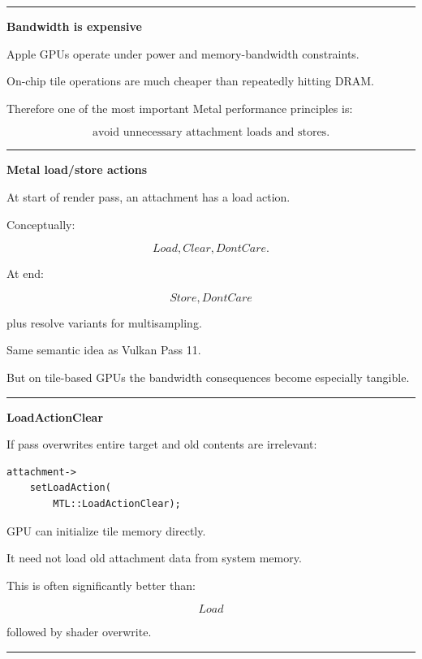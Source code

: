 \begin{center}\rule{0.5\linewidth}{0.5pt}\end{center}

\textbf{Bandwidth is expensive}

Apple GPUs operate under power and memory-bandwidth constraints.

On-chip tile operations are much cheaper than repeatedly hitting DRAM.

Therefore one of the most important Metal performance principles is:

\[
\boxed{
\text{avoid unnecessary attachment loads and stores}.
}
\]

\begin{center}\rule{0.5\linewidth}{0.5pt}\end{center}

\textbf{Metal load/store actions}

At start of render pass, an attachment has a load action.

Conceptually:

\[
Load,
Clear,
DontCare.
\]

At end:

\[
Store,
DontCare
\]

plus resolve variants for multisampling.

Same semantic idea as Vulkan Pass 11.

But on tile-based GPUs the bandwidth consequences become especially tangible.

\begin{center}\rule{0.5\linewidth}{0.5pt}\end{center}

\textbf{LoadActionClear}

If pass overwrites entire target and old contents are irrelevant:

\begin{verbatim}
attachment->
    setLoadAction(
        MTL::LoadActionClear);
\end{verbatim}

GPU can initialize tile memory directly.

It need not load old attachment data from system memory.

This is often significantly better than:

\[
Load
\]

followed by shader overwrite.

\begin{center}\rule{0.5\linewidth}{0.5pt}\end{center}


